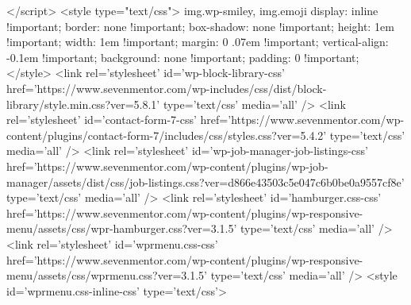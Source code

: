 		</script>
<style type="text/css">
img.wp-smiley,
img.emoji {
	display: inline !important;
	border: none !important;
	box-shadow: none !important;
	height: 1em !important;
	width: 1em !important;
	margin: 0 .07em !important;
	vertical-align: -0.1em !important;
	background: none !important;
	padding: 0 !important;
}
</style>
<link rel='stylesheet' id='wp-block-library-css' href='https://www.sevenmentor.com/wp-includes/css/dist/block-library/style.min.css?ver=5.8.1' type='text/css' media='all' />
<link rel='stylesheet' id='contact-form-7-css' href='https://www.sevenmentor.com/wp-content/plugins/contact-form-7/includes/css/styles.css?ver=5.4.2' type='text/css' media='all' />
<link rel='stylesheet' id='wp-job-manager-job-listings-css' href='https://www.sevenmentor.com/wp-content/plugins/wp-job-manager/assets/dist/css/job-listings.css?ver=d866e43503c5e047c6b0be0a9557cf8e' type='text/css' media='all' />
<link rel='stylesheet' id='hamburger.css-css' href='https://www.sevenmentor.com/wp-content/plugins/wp-responsive-menu/assets/css/wpr-hamburger.css?ver=3.1.5' type='text/css' media='all' />
<link rel='stylesheet' id='wprmenu.css-css' href='https://www.sevenmentor.com/wp-content/plugins/wp-responsive-menu/assets/css/wprmenu.css?ver=3.1.5' type='text/css' media='all' />
<style id='wprmenu.css-inline-css' type='text/css'>
